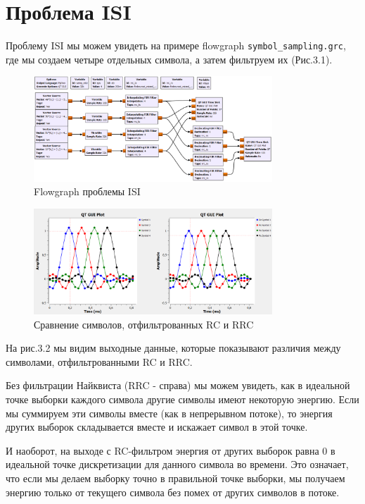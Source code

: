 \documentclass[a4paper,12pt]{report}
\begin{document}
\section{Проблема ISI}        
    Проблему ISI мы можем увидеть на примере flowgraph \texttt{symbol\_sampling.grc}, где мы создаем четыре отдельных символа, а затем фильтруем их (Рис.3.1).
\begin{figure}[H]
        \centering
        \includegraphics[width=0.8\textwidth]{fig3-1.PNG}
        \caption{Flowgraph проблемы ISI}
        \label{fig:fig3-1}
\end{figure}
\begin{figure}[H]
        \centering
        \includegraphics[width=0.8\textwidth]{fig3-2.PNG}
        \caption{Сравнение символов, отфильтрованных RC и RRC}
        \label{fig:fig3-2}
\end{figure} 

    На рис.3.2 мы видим выходные данные, которые показывают различия между символами, отфильтрованными RC и RRC. 
    
    Без фильтрации Найквиста (RRC - справа) мы можем увидеть, как в идеальной точке выборки каждого символа другие символы имеют некоторую энергию. Если мы суммируем эти символы вместе (как в непрерывном потоке), то энергия других выборок складывается вместе и искажает символ в этой точке. 
    
    И наоборот, на выходе с RC-фильтром энергия от других выборок равна 0 в идеальной точке дискретизации для данного символа во времени. Это означает, что если мы делаем выборку точно в правильной точке выборки, мы получаем энергию только от текущего символа без помех от других символов в потоке.
    
\end{document}
